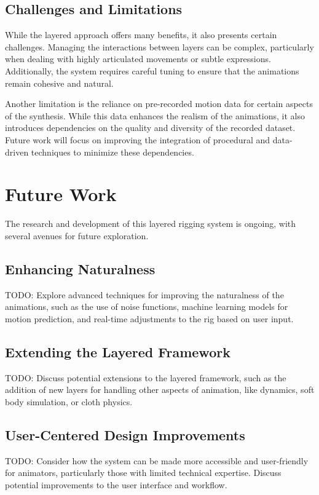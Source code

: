 \documentclass[../../main.tex]{subfiles}
\begin{document}
\subsection{Challenges and Limitations}
While the layered approach offers many benefits, it also presents certain challenges. Managing the interactions between layers can be complex, particularly when dealing with highly articulated movements or subtle expressions. Additionally, the system requires careful tuning to ensure that the animations remain cohesive and natural.

Another limitation is the reliance on pre-recorded motion data for certain aspects of the synthesis. While this data enhances the realism of the animations, it also introduces dependencies on the quality and diversity of the recorded dataset. Future work will focus on improving the integration of procedural and data-driven techniques to minimize these dependencies.

\section{Future Work}
The research and development of this layered rigging system is ongoing, with several avenues for future exploration.

\subsection{Enhancing Naturalness}
TODO: Explore advanced techniques for improving the naturalness of the animations, such as the use of noise functions, machine learning models for motion prediction, and real-time adjustments to the rig based on user input.

\subsection{Extending the Layered Framework}
TODO: Discuss potential extensions to the layered framework, such as the addition of new layers for handling other aspects of animation, like dynamics, soft body simulation, or cloth physics.

\subsection{User-Centered Design Improvements}
TODO: Consider how the system can be made more accessible and user-friendly for animators, particularly those with limited technical expertise. Discuss potential improvements to the user interface and workflow.
\end{document}
